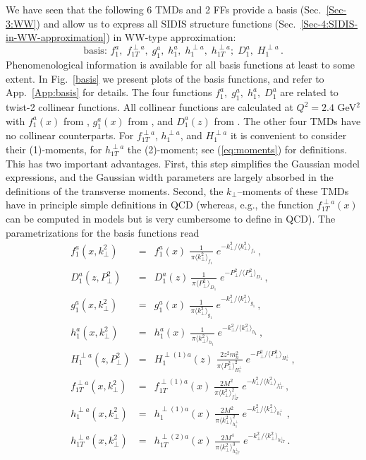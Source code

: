 \documentclass[a4paper,11pt]{article}
\newcommand{\be}{\begin{equation}}
\newcommand{\ee}{\end{equation}}
\newcommand{\ba}{\begin{eqnarray}}
\newcommand{\ea}{\end{eqnarray}}
\newcommand{\la}{\langle}
\newcommand{\ra}{\rangle}
\newcommand{\mh}{ m_h }
\def\kperp{k_\perp}
\def\pperp{P_\perp}
\def\avkperp{\la \kperp^2 \ra}
\def\avpperp{\la \pperp^2 \ra}
\begin{document}
We have seen that the following 6 TMDs and 2 FFs provide a basis
(Sec.~\ref{Sec-3:WW}) and allow us to express all SIDIS structure
functions (Sec.~\ref{Sec-4:SIDIS-in-WW-approximation})
in WW-type approximation:
\be\label{Eq:basis}
   \mbox{basis: \ \ }
   f_1^a, \; f_{1T}^{\perp a}, \; g_1^a, \; h_1^a, \;h_1^{\perp a},\; h_{1T}^{\perp a};
   \; D_1^a, \; H_1^{\perp a} \, .
\ee
Phenomenological information is available for all basis functions at
least to some extent.
In Fig.~\ref{basis} we present plots of the basis functions, and refer
to App.~\ref{App:basis} for details.
The four functions $f_1^a, \; g_1^a, \; h_1^a,\; D_1^a$  are related to
twist-2 collinear functions. All collinear functions are calculated at
$Q^2 = 2.4$ GeV$^2$ with $f_1^a(x)$ from \cite{Martin:2009iq},
$g_1^a(x)$ from \cite{Gluck:1998xa}, and $D_1^a(z)$ from
\cite{deFlorian:2007aj}. The other four TMDs
have no collinear counterparts.
For $f_{1T}^{\perp a}$, $h_1^{\perp a}$, and $H_1^{\perp a}$ it is convenient to
consider their (1)-moments, for $ h_{1T}^{\perp a}$  the (2)-moment;
see (\ref{eq:moments}) for definitions.
This has two important advantages. First, this step simplifies
the Gaussian model expressions, and the Gaussian width parameters are
largely absorbed in the definitions of the transverse moments. Second,
the $k_\perp$--moments of these TMDs have in principle simple definitions
in QCD (whereas, e.g., the function $f_{1T}^{\perp a}(x)$ can be computed in
models but is very cumbersome to define in QCD).
The parametrizations for the basis functions read
\begin{subequations}\ba
	f^a_1(x,\kperp^2) &=& f^a_1(x)\;
    	\frac{1}{\,\pi\avkperp_{f_1}}\;e^{-\kperp^2/\avkperp_{f_1}} \, ,
	\label{Eq:Gauss-f1}\\
    	D^a_1(z,\pperp^2) &=& D_1^a(z)\,
    	\frac{1}{\,\pi\avpperp_{D_1}}\;e^{-\pperp^2/\avpperp_{D_1}} \, ,
	\label{Eq:Gauss-D1}\\
	g^a_1(x,\kperp^2) &=& g^a_1(x)\;
    	\frac{1}{\,\pi\avkperp_{g_1}}\;e^{-\kperp^2/\avkperp_{g_1}} \, ,
	\label{Eq:Gauss-g1}\\
	h_{1}^{a} (x, \kperp^2) &=& h_{1}^{a} (x)\;
  	\frac{1}{\,\pi \avkperp_{h_1}}\;e^{-{\kperp^2}/{\avkperp_{h_1} }} \, ,
	\label{Eq:Gauss-h1}\\
	H_{1}^{\perp a}(z,\pperp^2) &=&  H_{1}^{\perp (1) a}(z) \;
	\frac{2 z^2 \mh^2}{\pi \avpperp_{H_{1}^\perp}^2} \;
	e^{-\pperp^2/{\avpperp_{H_{1}^\perp}}}\, ,\\
	f_{1T}^{\perp a}(x,\kperp^2) &=&  f_{1T}^{\perp (1) a}(x)   \;
	\frac{2 M^2}{\pi \avkperp_{f_{1T}^\perp}^2} \;
	e^{-\kperp^2/{\avkperp_{f_{1T}^\perp}}}
	\label{Eq:Gauss-f1Tperp}\, ,\\
	h_{1}^{\perp a}(x,\kperp^2) &=&  h_{1}^{\perp (1) a}(x)\;
   	\frac{2 M^2}{\pi \avkperp_{h_{1}^\perp}^2}\;
 	e^{-\kperp^2/{\avkperp_{h_{1}^\perp}}}\,
	\label{Eq:Gauss-h1perp}\, ,\\
	h_{1T}^{\perp a}(x,\kperp^2) &=&  h_{1T}^{\perp (2) a}(x)\;
   	\frac{2 M^4}{\pi \avkperp_{h_{1T}^\perp}^3} \;
	e^{-\kperp^2/{\avkperp_{h_{1T}^\perp}}}
	\label{Eq:Gauss-h1Tperp}\, .
\ea\end{subequations}
\end{document}

